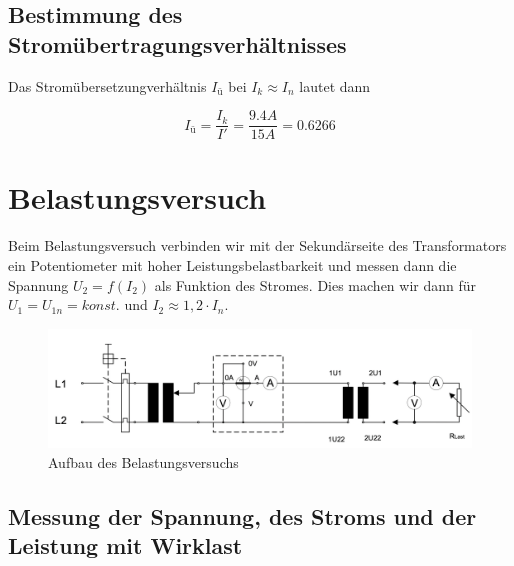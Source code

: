 \documentclass{article}
\begin{document}
\subsection{Bestimmung des Stromübertragungsverhältnisses}

Das Stromübersetzungverhältnis $I_{ü}$ bei $I_{k} \approx I_{n}$ lautet dann

\begin{equation*}
  I_{ü} = \frac{I_{k}}{I'} = \frac{9.4A}{15A} = 0.6266
\end{equation*}

\newpage

\section{Belastungsversuch}
\label{sec:belastungsversuch}

Beim Belastungsversuch verbinden wir mit der Sekundärseite des Transformators ein Potentiometer mit hoher Leistungsbelastbarkeit und messen dann die Spannung $U_{2} = f(I_{2})$ als Funktion des Stromes. Dies machen wir dann für $U_{1} = U_{1n} = konst.$ und $I_{2} \approx 1,2 \cdot I_{n}$.
\begin{figure}[h]
  \centering
  \includegraphics[width=\textwidth]{../assets/images/gep3/belastung_aufbau.png}
  \caption{Aufbau des Belastungsversuchs}
  \label{fig:belastaufbau}
\end{figure}
\subsection{Messung der Spannung, des Stroms und der Leistung mit Wirklast}
\label{sec:messung-der-spannung}
\end{document}
